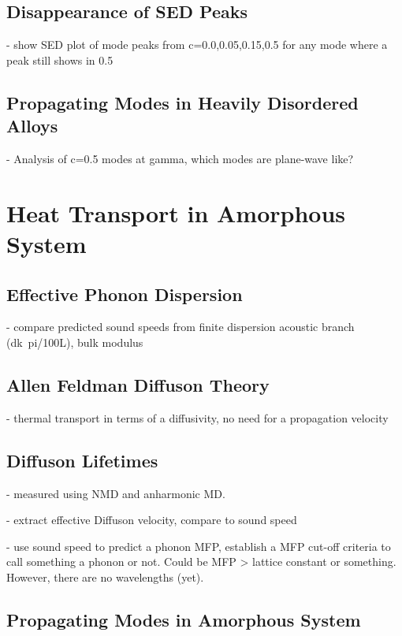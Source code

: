 \documentclass[aps,prb,preprint,superscriptaddress,amsmath,amssymb,floatfix]{revtex4}
\begin{document}
\subsection{\label{S-Motivation-Amorphous}Disappearance of SED Peaks}

- show SED plot of mode peaks from c=0.0,0.05,0.15,0.5 for any mode where a peak still shows in 0.5

\subsection{\label{S-Motivation-Amorphous}Propagating Modes in Heavily Disordered Alloys}

- Analysis of c=0.5 modes at gamma, which modes are plane-wave like? 


\section{\label{S-Motivation} Heat Transport in Amorphous System}

\subsection{\label{S-Motivation-Amorphous}Effective Phonon Dispersion}

- compare predicted sound speeds from finite dispersion acoustic branch (dk~pi/100L), bulk modulus

\subsection{\label{S-Motivation-Amorphous}Allen Feldman Diffuson Theory}

- thermal transport in terms of a diffusivity, no need for a propagation velocity

\subsection{\label{S-Motivation-Amorphous}Diffuson Lifetimes}

- measured using NMD and anharmonic MD.

- extract effective Diffuson velocity, compare to sound speed

- use sound speed to predict a phonon MFP, establish a MFP cut-off criteria to call something a phonon or not.  Could be MFP > lattice constant or something.  However, there are no wavelengths (yet).

\subsection{\label{S-Motivation-Amorphous}Propagating Modes in Amorphous System}
\end{document}
